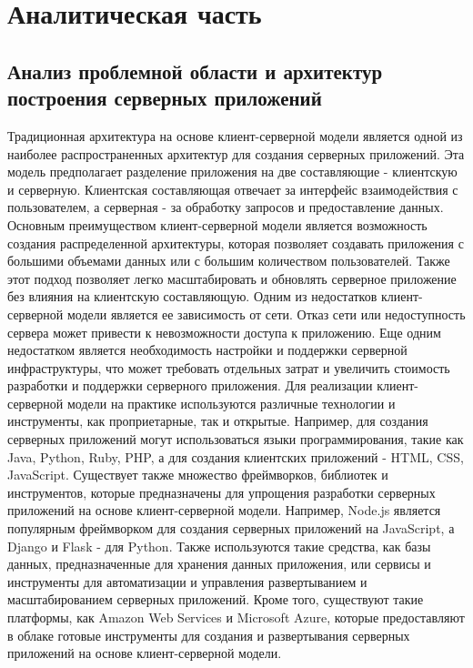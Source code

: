 \chapter{Аналитическая часть}
\label{chapter1}

\section{Анализ проблемной области и архитектур построения серверных приложений}

Традиционная архитектура на основе клиент-серверной модели является одной из наиболее распространенных архитектур для создания серверных приложений. Эта модель предполагает разделение приложения на две составляющие - клиентскую и серверную. Клиентская составляющая отвечает за интерфейс взаимодействия с пользователем, а серверная - за обработку запросов и предоставление данных.
Основным преимуществом клиент-серверной модели является возможность создания распределенной архитектуры, которая позволяет создавать приложения с большими объемами данных или с большим количеством пользователей. Также этот подход позволяет легко масштабировать и обновлять серверное приложение без влияния на клиентскую составляющую.
Одним из недостатков клиент-серверной модели является ее зависимость от сети. Отказ сети или недоступность сервера может привести к невозможности доступа к приложению. Еще одним недостатком является необходимость настройки и поддержки серверной инфраструктуры, что может требовать отдельных затрат и увеличить стоимость разработки и поддержки серверного приложения.
Для реализации клиент-серверной модели на практике используются различные технологии и инструменты, как проприетарные, так и открытые. Например, для создания серверных приложений могут использоваться языки программирования, такие как Java, Python, Ruby, PHP, а для создания клиентских приложений - HTML, CSS, JavaScript.
Существует также множество фреймворков, библиотек и инструментов, которые предназначены для упрощения разработки серверных приложений на основе клиент-серверной модели. Например, Node.js является популярным фреймворком для создания серверных приложений на JavaScript, а Django и Flask - для Python.
Также используются такие средства, как базы данных, предназначенные для хранения данных приложения, или сервисы и инструменты для автоматизации и управления развертыванием и масштабированием серверных приложений. Кроме того, существуют такие платформы, как Amazon Web Services и Microsoft Azure, которые предоставляют в облаке готовые инструменты для создания и развертывания серверных приложений на основе клиент-серверной модели.

